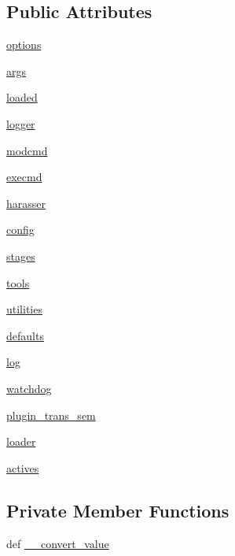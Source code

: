 \subsection*{Public Attributes}
\begin{DoxyCompactItemize}
\item 
\hyperlink{class_test_def_1_1_test_def_a7c7d587995154a9f31607dc4726d3a2a}{options}
\item 
\hyperlink{class_test_def_1_1_test_def_a30e459036991de30822f267f1d882d44}{args}
\item 
\hyperlink{class_test_def_1_1_test_def_a21764cc1b70626946a708b7a0f003b38}{loaded}
\item 
\hyperlink{class_test_def_1_1_test_def_a2ec3a5ec20bb6ba539d68c3c5a40ca5d}{logger}
\item 
\hyperlink{class_test_def_1_1_test_def_af6c1e9ceaf9d8e747bbb57af3bd33198}{modcmd}
\item 
\hyperlink{class_test_def_1_1_test_def_aa3ffe5befea4becaad6a8c5f13446039}{execmd}
\item 
\hyperlink{class_test_def_1_1_test_def_a1dc633e4dd69542c5eb07e880d7ea401}{harasser}
\item 
\hyperlink{class_test_def_1_1_test_def_a85a2e1fffeda060f750494dd4082594d}{config}
\item 
\hyperlink{class_test_def_1_1_test_def_a9e15c13bd0cc9b1567c94f847118432e}{stages}
\item 
\hyperlink{class_test_def_1_1_test_def_a2414cc1583555b0c758e0f9f0952a787}{tools}
\item 
\hyperlink{class_test_def_1_1_test_def_a0b9ea6f06c02401ad62e06c4cfd80bd2}{utilities}
\item 
\hyperlink{class_test_def_1_1_test_def_a96d72418702f22844fc2fd5d774c7291}{defaults}
\item 
\hyperlink{class_test_def_1_1_test_def_a50bbc74a64733e7dbec613bbfe3a519d}{log}
\item 
\hyperlink{class_test_def_1_1_test_def_a40da46aa95507cffa798cb152fa69e27}{watchdog}
\item 
\hyperlink{class_test_def_1_1_test_def_ac4a745e8b2151d1eed56e04770562eb9}{plugin\-\_\-trans\-\_\-sem}
\item 
\hyperlink{class_test_def_1_1_test_def_a07a19e8ffafc926b0732d466a837b13b}{loader}
\item 
\hyperlink{class_test_def_1_1_test_def_a1eb766274fa9869e6b04e612e6d169b0}{actives}
\end{DoxyCompactItemize}
\subsection*{Private Member Functions}
\begin{DoxyCompactItemize}
\item 
def \hyperlink{class_test_def_1_1_test_def_a2ed090ffdc5882b9855a22a6ec408185}{\-\_\-\-\_\-convert\-\_\-value}
\end{DoxyCompactItemize}


